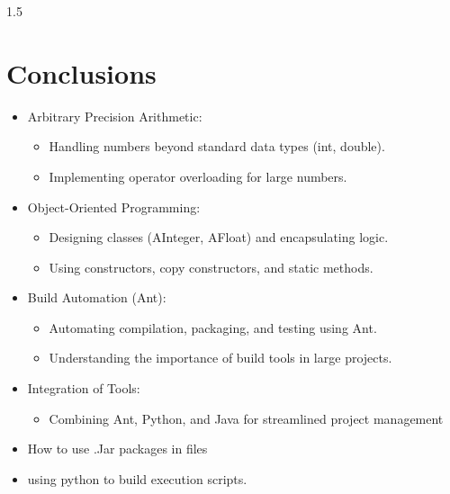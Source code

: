 \documentclass{article}
\begin{document}
\begin{spacing}{1.5}
{\section{Conclusions}
\begin{itemize}
    \item Arbitrary Precision Arithmetic:
    \begin{itemize}
        \item Handling numbers beyond standard data types (int, double).
        \item Implementing operator overloading for large numbers. 
    \end{itemize}
    \item Object-Oriented Programming:
    \begin{itemize}
        \item Designing classes (AInteger, AFloat) and encapsulating logic.
        \item Using constructors, copy constructors, and static methods.
    \end{itemize}
    \item Build Automation (Ant):
    \begin{itemize}
        \item Automating compilation, packaging, and testing using Ant.
        \item Understanding the importance of build tools in large projects.
    \end{itemize}
    \item Integration of Tools:
    \begin{itemize}
        \item Combining Ant, Python, and Java for streamlined project management
    \end{itemize}
    \item How to use .Jar packages in files
    \item using python to build execution scripts.

\end{itemize}

 }\end{spacing}
\end{document}

